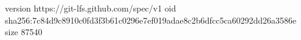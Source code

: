 version https://git-lfs.github.com/spec/v1
oid sha256:7c84d9c8910c0fd3f3b61c0296e7ef019adae8c2b6dfcc5ca60292dd26a3586e
size 87540
